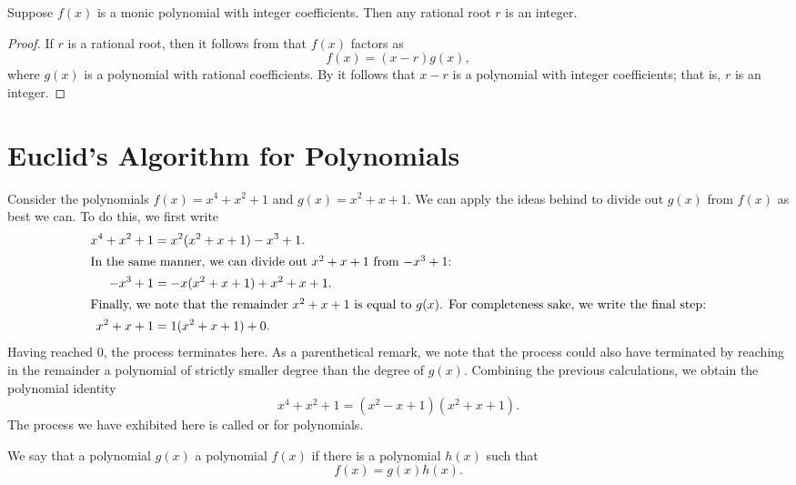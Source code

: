 \begin{corollary}
  Suppose $f(x)$ is a monic polynomial with integer coefficients. Then any rational root $r$ is an integer.
\end{corollary}

\begin{proof}
  If $r$ is a rational root, then it follows from  that $f(x)$ factors as
  \begin{equation*}
    f(x)=(x-r)g(x),
  \end{equation*}
  where $g(x)$ is a polynomial with rational coefficients. By  it follows that $x-r$ is a polynomial with integer coefficients; that is, $r$ is an integer.
\end{proof}
  
\section{Euclid's Algorithm for Polynomials}

\begin{example}
  Consider the polynomials $f(x)=x^4+x^2+1$ and $g(x)=x^2+x+1$. We can apply the ideas behind  to divide out $g(x)$ from $f(x)$ as best we can. To do this, we first write
  \begin{align*}
    x^4+x^2+1 & =x^2(x^2+x+1)-x^3+1. \\
    \intertext{In the same manner, we can divide out $x^2+x+1$ from $-x^3+1$:}
    -x^3+1 & =-x(x^2+x+1)+x^2+x+1. \\
    \intertext{Finally, we note that the remainder $x^2+x+1$ is equal to $g(x)$. For completeness sake, we write the final step:}
    x^2+x+1 & =1(x^2+x+1)+0.
  \end{align*}
  Having reached $0$, the process terminates here. As a parenthetical remark, we note that the process could also have terminated by reaching in the remainder a polynomial of strictly smaller degree than the degree of $g(x)$. Combining the previous calculations, we obtain the polynomial identity
  \begin{equation*}
    x^4+x^2+1=(x^2-x+1)(x^2+x+1).
  \end{equation*}
  The process we have exhibited here is called  or  for polynomials.
\end{example}

\begin{definition}
  We say that a polynomial $g(x)$  a polynomial $f(x)$ if there is a polynomial $h(x)$ such that
  \begin{equation*}
    f(x)=g(x)h(x).
  \end{equation*}
\end{definition}

